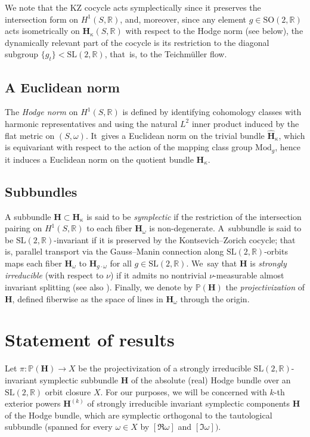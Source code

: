 \documentclass[10pt]{amsart}
\theoremstyle{plain}
\theoremstyle{definition}
\numberwithin{equation}{subsection}
\newcommand\bP{\mathbb{P}}
\newcommand\bR{\mathbb{R}}\let\R\bR
\newcommand{\Mod}{\mathrm{Mod}}
\newcommand{\SL}{\mathrm{SL}}
\newcommand{\SO}{\mathrm{SO}}
\newcommand{\bfH}{\boldsymbol{H}}
\begin{document}
We note that the KZ cocycle acts symplectically since it preserves the intersection form on $H^1(S,\bR)$, and, moreover, since any element $g\in \SO(2, \R)$ acts isometrically on
$\textbf{H}_\kappa(S, \bR)$ with respect to the Hodge norm (see below), the dynamically relevant part of the
cocycle is its restriction to the diagonal subgroup $\{g_t\} <\SL(2,\R)$, that~is, to the Teichmüller flow.

\subsection{A Euclidean norm}\label{eucnorm} The \emph{Hodge norm} on $H^1(S, \mathbb{R})$ is defined by identifying cohomology classes with harmonic representatives and using the natural $L^2$ inner product induced by the flat metric on $(S, \omega)$. It~gives a Euclidean norm on the trivial bundle $\widehat{\bfH}_\kappa$, which is equivariant with respect to the action of the mapping class group $\Mod_g$, hence it induces a Euclidean norm on the quotient bundle $\bfH_\kappa$.

\subsection{Subbundles}
A subbundle $\bfH \subset \bfH_\kappa$ is said to be \emph{symplectic} if the restriction of the intersection pairing on $H^1(S, \mathbb{R})$ to each fiber $\bfH_\omega$ is non-degenerate. A~subbundle is said to be $\SL(2,\mathbb{R})$-invariant if it is preserved by the Kontsevich–Zorich cocycle; that is, parallel transport via the Gauss–Manin connection along $\SL(2,\mathbb{R})$-orbits maps each fiber $\bfH_\omega$ to $\bfH_{g \cdot \omega}$ for all $g \in \SL(2,\mathbb{R})$. We~say that $\bfH$ is \emph{strongly irreducible} (with respect to $\nu$) if it admits no nontrivial $\nu$-measurable almost invariant splitting (see also \cite[Def.\,1.3]{CE13}). Finally, we denote by $\mathbb{P}(\bfH)$ the \emph{projectivization} of $\bfH$, defined fiberwise as the space of lines in $\bfH_\omega$ through the origin.

\section{Statement of results}\label{statement}

Let $\pi: \bP(\bfH) \to X$ be the projectivization of a strongly irreducible $\SL(2,\bR)$-invariant symplectic subbundle $\bfH$ of the absolute (real) Hodge bundle over an $\SL(2,\bR)$ orbit closure $X$. For our purposes, we will be concerned with $k$-th exterior powers $\bfH^{(k)}$ of strongly irreducible invariant symplectic components $\bfH$ of the Hodge bundle, which are symplectic orthogonal to the tautological subbundle (spanned for every $\omega \in X $ by $[\Re \omega]$ and $[\Im \omega])$.
\end{document}

